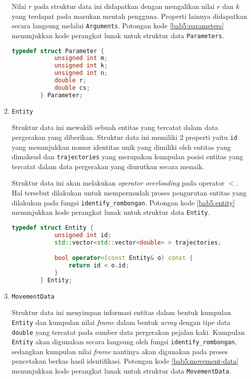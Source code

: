 \begin{enumerate}
    Nilai $r$ pada struktur data ini didapatkan dengan mengalikan nilai $r$ dan $k$ yang terdapat pada masukan mentah pengguna. Properti lainnya didapatkan secara langsung melalui \texttt{Arguments}. Potongan kode \ref{bab5:parameters} menunjukkan kode perangkat lunak untuk struktur data \texttt{Parameters}.
    
    \begin{lstlisting}[language=C++, caption=Implementasi \texttt{Parameters}, label={bab5:parameters}]
        typedef struct Parameter {
            unsigned int m;
            unsigned int k;
            unsigned int n;
            double r;
            double cs;
        } Parameter;
    \end{lstlisting}
    
    \item \texttt{Entity}
    
    Struktur data ini mewakili sebuah entitas yang tercatat dalam data pergerakan yang diberikan. Struktur data ini memiliki 2 properti yaitu \texttt{id} yang menunjukkan nomor identitas unik yang dimiliki oleh entitas yang dimaksud dan \texttt{trajectories} yang merupakan kumpulan posisi entitas yang tercatat dalam data pergerakan yang diurutkan secara menaik.
    
    Struktur data ini akan melakukan \textit{operator overloading} pada operator $<$. Hal tersebut dilakukan untuk mempermudah proses pengurutan entitas yang dilakukan pada fungsi \texttt{identify\_rombongan}. Potongan kode \ref{bab5:entity} menunjukkan kode perangkat lunak untuk struktur data \texttt{Entity}.
    
    \begin{lstlisting}[language=C++, caption=Implementasi \texttt{Entity}, label={bab5:entity}]
        typedef struct Entity {
            unsigned int id;
            std::vector<std::vector<double> > trajectories;

            bool operator<(const Entity& o) const {
                return id < o.id;
            }
        } Entity;
    \end{lstlisting}
    
    \item \texttt{MovementData}
    
    Struktur data ini menyimpan informasi entitas dalam bentuk kumpulan \texttt{Entity} dan kumpulan nilai \textit{frame} dalam bentuk \textit{array} dengan tipe data \texttt{double} yang tercatat pada sumber data pergerakan pejalan kaki. Kumpulan \texttt{Entity} akan digunakan secara langsung oleh fungsi \texttt{identify\_rombongan}, sedangkan kumpulan nilai \textit{frame} nantinya akan digunakan pada proses pencetakan berkas hasil identifikasi. Potongan kode \ref{bab5:movement-data} menunjukkan kode perangkat lunak untuk struktur data \texttt{MovementData}.
    

\end{enumerate}
